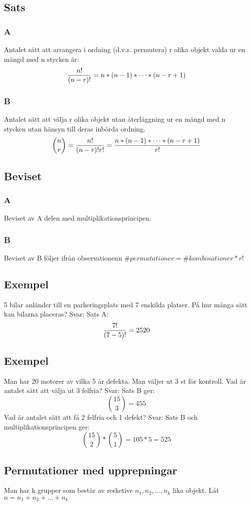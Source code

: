 \documentclass{article}
\begin{document}
\subsection{Sats}
\subsubsection{A}
Antalet sätt att arrangera i ordning (d.v.s. permutera) r olika objekt valda ur en mängd med n stycken är:
$$ \frac{n!}{(n-r)!} = n*(n-1)*\cdots*(n-r+1) $$
\subsubsection{B}
Antalet sätt att välja r olika objekt utan återläggning ur en mängd med n stycken utan hänsyn till deras inbörda ordning.
$$ {n \choose r} = \frac{n!}{(n-r)!r!} = \frac{n*(n-1)*\cdots*(n-r+1)}{r!} $$

\subsection{Beviset}
\subsubsection{A}
Beviset av A delen med multiplikationsprincipen.
\subsubsection{B}
Beviset av B följer ifrån observationenn $ \# permutationer = \# kombinationer * r! $

\subsection{Exempel}
5 bilar anländer till en parkeringsplats med 7 enskilda platser. På hur många sätt kan bilarna placeras?
Svar: Sats A:
$$ \frac{7!}{(7-5)!} = 2520 $$

\subsection{Exempel}
Man har 20 motorer av vilka 5 är defekta. Man väljer ut 3 st för kontroll. Vad är antalet sätt att välja ut 3 felfria?
Svar: Sats B ger:
$$ {15 \choose 3} = 455 $$
Vad är antalet sätt att få 2 felfria och 1 defekt?
Svar: Sats B och multiplikationsprincipen ger:
$$ {15 \choose 2}*{5 \choose 1} = 105 * 5 = 525 $$

\subsection{Permutationer med upprepningar}
Man har k grupper som består av resketive $ n_1, n_2, \dots , n_k $ lika objekt. Låt $ n = n_1 + n_2 + \dots + n_k$
\end{document}
